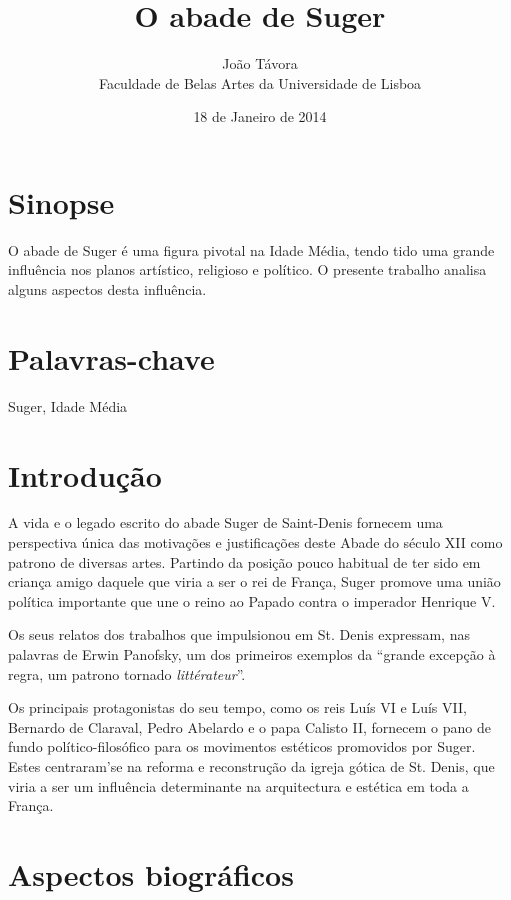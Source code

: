 \documentclass{article}
\title{O abade de Suger}
\date{18 de Janeiro de 2014}
\author{João Távora \\Faculdade de Belas Artes da Universidade de Lisboa}
\begin{document}
\maketitle

\section{Sinopse}

O abade de Suger é uma figura pivotal na Idade Média, tendo tido uma
grande influência nos planos artístico, religioso e político. O
presente trabalho analisa alguns aspectos desta influência.

\section{Palavras-chave}

Suger, Idade Média

\section{Introdução}

A vida e o legado escrito do abade Suger de Saint-Denis fornecem uma
perspectiva única das motivações e justificações deste Abade do século
XII como patrono de diversas artes. Partindo da posição pouco habitual
de ter sido em criança amigo daquele que viria a ser o rei de França,
Suger promove uma união política importante que une o reino ao Papado
contra o imperador Henrique V.

Os seus relatos dos trabalhos que impulsionou em St. Denis expressam,
nas palavras de Erwin Panofsky, um dos primeiros exemplos da ``grande
excepção à regra, um patrono tornado \emph{littérateur}''.

Os principais protagonistas do seu tempo, como os reis Luís VI e Luís
VII, Bernardo de Claraval, Pedro Abelardo e o papa Calisto II,
fornecem o pano de fundo político-filosófico para os movimentos
estéticos promovidos por Suger. Estes centraram'se na reforma e
reconstrução da igreja gótica de St. Denis, que viria a ser um
influência determinante na arquitectura e estética em toda a França.

\section{Aspectos biográficos}
\end{document}
